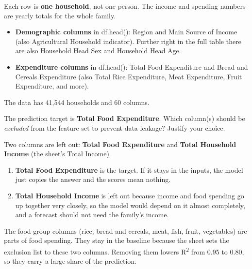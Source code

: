 \documentclass[12pt,a4paper]{article}
\providecommand{\tightlist}{\setlength{\itemsep}{0pt}\setlength{\parskip}{0pt}}
\begin{document}
\begin{answerbox}
Each row is \textbf{one household}, not one person. The income and spending numbers are yearly totals for the whole family.

\begin{itemize}
\tightlist
\item
  \textbf{Demographic columns} in df.head(): Region and Main Source of Income (also Agricultural Household indicator). Further right in the full table there are also Household Head Sex and Household Head Age.
\item
  \textbf{Expenditure columns} in df.head(): Total Food Expenditure and Bread and Cereals Expenditure (also Total Rice Expenditure, Meat Expenditure, Fruit Expenditure, and more).
\end{itemize}

The data has 41,544 households and 60 columns.

\end{answerbox}

\begin{tcolorbox}[colback=lightblue!40, colframe=myColorB, title={\textbf{Reflection Question 2}}, fonttitle=\small\bfseries, breakable]
The prediction target is \textbf{Total Food Expenditure}.
Which column(s) should be \emph{excluded} from the feature set to prevent data leakage?
Justify your choice.
\end{tcolorbox}

\begin{answerbox}
Two columns are left out: \textbf{Total Food Expenditure} and \textbf{Total Household Income} (the sheet's Total Income).

\begin{enumerate}
\item \textbf{Total Food Expenditure} is the target. If it stays in the inputs, the model just copies the answer and the scores mean nothing.
\item \textbf{Total Household Income} is left out because income and food spending go up together very closely, so the model would depend on it almost completely, and a forecast should not need the family's income.
\end{enumerate}

The food-group columns (rice, bread and cereals, meat, fish, fruit, vegetables) are parts of food spending. They stay in the baseline because the sheet sets the exclusion list to these two columns. Removing them lowers R\textsuperscript{2} from 0.95 to 0.80, so they carry a large share of the prediction.
\end{answerbox}
\end{document}
